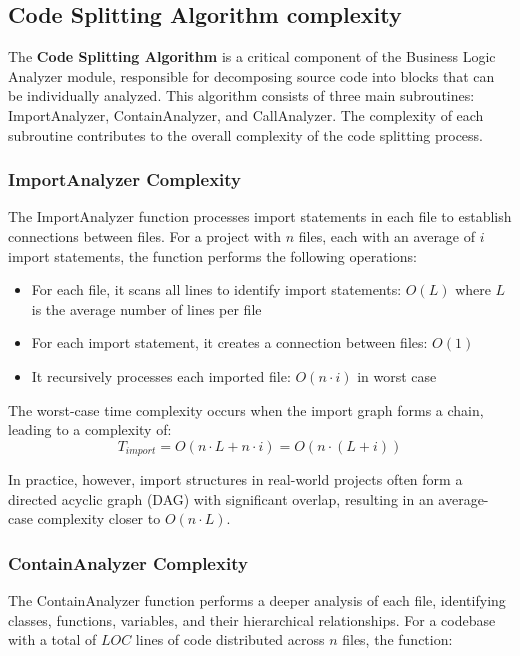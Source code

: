 \subsection{Code Splitting Algorithm complexity}

The \textbf{Code Splitting Algorithm} is a critical component of the Business Logic Analyzer module, responsible for decomposing source code into blocks that can be individually analyzed. This algorithm consists of three main subroutines: ImportAnalyzer, ContainAnalyzer, and CallAnalyzer. The complexity of each subroutine contributes to the overall complexity of the code splitting process.

\subsubsection{ImportAnalyzer Complexity}

The ImportAnalyzer function processes import statements in each file to establish connections between files. For a project with $n$ files, each with an average of $i$ import statements, the function performs the following operations:

\begin{itemize}
    \item For each file, it scans all lines to identify import statements: $O(L)$ where $L$ is the average number of lines per file
    \item For each import statement, it creates a connection between files: $O(1)$
    \item It recursively processes each imported file: $O(n \cdot i)$ in worst case
\end{itemize}

The worst-case time complexity occurs when the import graph forms a chain, leading to a complexity of:
\begin{equation}
T_{import} = O(n \cdot L + n \cdot i) = O(n \cdot (L + i))
\end{equation}

In practice, however, import structures in real-world projects often form a directed acyclic graph (DAG) with significant overlap, resulting in an average-case complexity closer to $O(n \cdot L)$.

\subsubsection{ContainAnalyzer Complexity}

The ContainAnalyzer function performs a deeper analysis of each file, identifying classes, functions, variables, and their hierarchical relationships. For a codebase with a total of $LOC$ lines of code distributed across $n$ files, the function:

